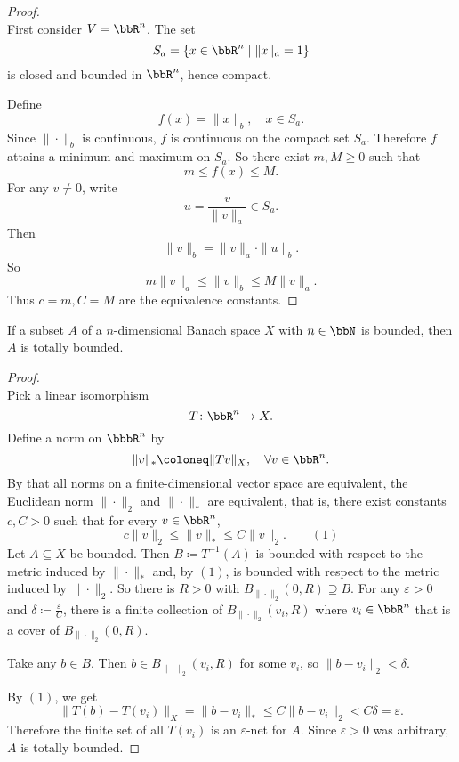 \documentclass[a4paper,12pt]{article}
\begin{document}
\begin{proof}\mbox{}\\
    First consider $V=\bbR^n$. The set
    \[S_a=\{x\in\bbR^n\mid\|x\|_a=1\}\]
    is closed and bounded in $\bbR^n$, hence compact.

    Define
    \[f(x)=\|x\|_b,\quad x\in S_a.\]
    Since $\|\cdot\|_b$ is continuous, $f$ is continuous on the compact set $S_a$. Therefore $f$ attains a minimum and maximum on $S_a$. So there exist $m,M\geq 0$ such that
    \[m\leq f(x)\leq M.\]
    For any $v\neq 0$, write
    \[u=\frac{v}{\|v\|_a}\in S_a.\]
    Then
    \[\|v\|_b=\|v\|_a\cdot\|u\|_b.\]
    So
    \[m\|v\|_a\leq\|v\|_b\leq M\|v\|_a.\]
    Thus $c=m,C=M$ are the equivalence constants.
\end{proof}
 If a subset $A$ of a $n$-dimensional Banach space $X$ with $n\in\bbN$ is bounded, then $A$ is totally bounded.

\begin{proof}\mbox{}\\
    Pick a linear isomorphism
    \[T\colon\bbR^n\to X.\]
    Define a norm on $\bbbR^n$ by
    \[\|v\|_*\coloneq\|Tv\|_X,\quad\forall v\in\bbR^n.\]
    By that all norms on a finite-dimensional vector space are equivalent, the Euclidean norm $\|\cdot\|_2$ and $\|\cdot\|_*$ are equivalent, that is, there exist constants $c,C>0$ such that for every $v\in \bbR^n$,
    \[c\|v\|_2\leq\|v\|_*\leq C\|v\|_2.\qquad (1)\]
    Let $A\subseteq X$ be bounded. Then $B\coloneq T^{-1}(A)$ is bounded with respect to the metric induced by $\|\cdot\|_*$ and, by $(1)$, is bounded with respect to the metric induced by $\|\cdot\|_2$. So there is $R>0$ with $B_{\|\cdot\|_2}(0,R)\supseteq B$.
    For any $\varepsilon>0$ and $\delta\coloneq\frac{\varepsilon}{C}$, there is a finite collection of $B_{\|\cdot\|_2}(v_i,R)$ where $v_i\in\bbR^n$ that is a cover of $B_{\|\cdot\|_2}(0,R)$.

    Take any $b\in B$. Then $b\in B_{\|\cdot\|_2}(v_i,R)$ for some $v_i$, so $\|b-v_i\|_2<\delta$.

    By $(1)$, we get
    \[\|T(b)-T(v_i)\|_X=\|b-v_i\|_*\leq C\|b-v_i\|_2<C\delta=\varepsilon.\]
    Therefore the finite set of all $T(v_i)$ is an $\varepsilon$-net for $A$. Since $\varepsilon>0$ was arbitrary, $A$ is totally bounded.
\end{proof}
\end{document}
